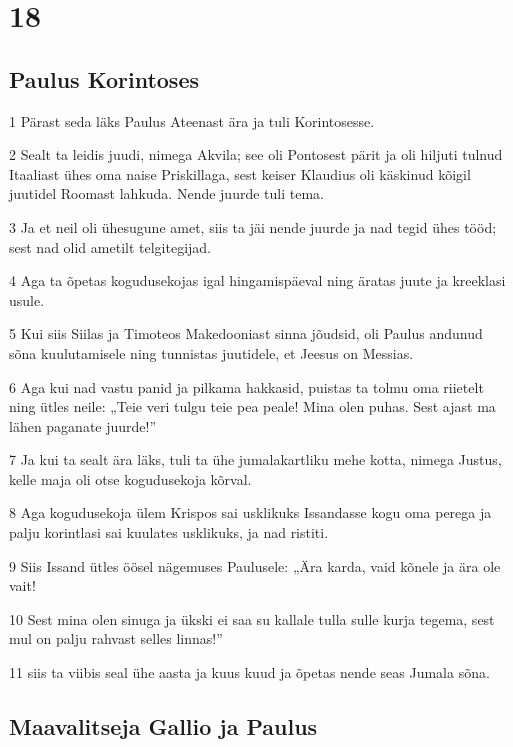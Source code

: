 \chapter{18}

\section*{Paulus Korintoses}

\par 1 Pärast seda läks Paulus Ateenast ära ja tuli Korintosesse.
\par 2 Sealt ta leidis juudi, nimega Akvila; see oli Pontosest pärit ja oli hiljuti tulnud Itaaliast ühes oma naise Priskillaga, sest keiser Klaudius oli käskinud kõigil juutidel Roomast lahkuda. Nende juurde tuli tema.
\par 3 Ja et neil oli ühesugune amet, siis ta jäi nende juurde ja nad tegid ühes tööd; sest nad olid ametilt telgitegijad.
\par 4 Aga ta õpetas kogudusekojas igal hingamispäeval ning äratas juute ja kreeklasi usule.
\par 5 Kui siis Siilas ja Timoteos Makedooniast sinna jõudsid, oli Paulus andunud sõna kuulutamisele ning tunnistas juutidele, et Jeesus on Messias.
\par 6 Aga kui nad vastu panid ja pilkama hakkasid, puistas ta tolmu oma riietelt ning ütles neile: „Teie veri tulgu teie pea peale! Mina olen puhas. Sest ajast ma lähen paganate juurde!”
\par 7 Ja kui ta sealt ära läks, tuli ta ühe jumalakartliku mehe kotta, nimega Justus, kelle maja oli otse kogudusekoja kõrval.
\par 8 Aga kogudusekoja ülem Krispos sai usklikuks Issandasse kogu oma perega ja palju korintlasi sai kuulates usklikuks, ja nad ristiti.
\par 9 Siis Issand ütles öösel nägemuses Paulusele: „Ära karda, vaid kõnele ja ära ole vait!
\par 10 Sest mina olen sinuga ja ükski ei saa su kallale tulla sulle kurja tegema, sest mul on palju rahvast selles linnas!”
\par 11 siis ta viibis seal ühe aasta ja kuus kuud ja õpetas nende seas Jumala sõna.

\section*{Maavalitseja Gallio ja Paulus}

